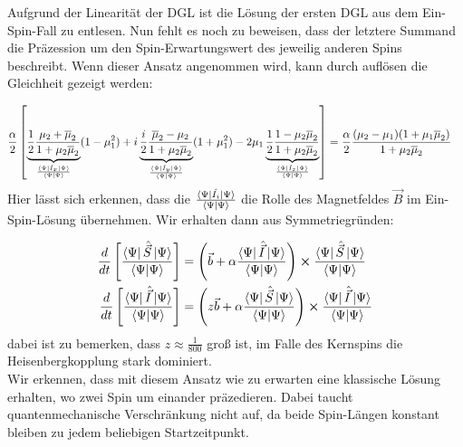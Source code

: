 \noindent Aufgrund der Linearität der DGL ist die Lösung der ersten DGL aus dem Ein-Spin-Fall zu entlesen. Nun fehlt es noch zu beweisen, 
dass der letztere Summand die Präzession um den Spin-Erwartungswert des jeweilig anderen Spins beschreibt. Wenn dieser Ansatz angenommen wird,
kann durch auflösen die Gleichheit gezeigt werden:  

\begin{align}
     \frac{\alpha}{2}\left[\underbrace{\frac{1}{2}\frac{\mu_2 + \overline{\mu}_2}{1+\mu_2\overline{\mu}_2}}_{\frac{\bra{\Psi}\hat{I}_x\ket{\Psi}}{\bra{\Psi}\ket{\Psi}}}(1-\mu_1^2) 
     + i \underbrace{\frac{i}{2}\frac{\overline{\mu}_2 -\mu_2}{1+\mu_2\overline{\mu}_2}}_{\frac{\bra{\Psi}\hat{I}_y\ket{\Psi}}{\bra{\Psi}\ket{\Psi}}}(1+\mu_1^2) 
     - 2\mu_1\underbrace{\frac{1}{2}\frac{1-\mu_2\overline{\mu}_2}{1+\mu_2\overline{\mu}_2}}_{\frac{\bra{\Psi}\hat{I}_z\ket{\Psi}}{\bra{\Psi}\ket{\Psi}}} \right]
     &= \frac{\alpha}{2} \frac{(\mu_2-\mu_1)(1+\mu_1\overline{\mu}_2)}{1+\mu_2\overline{\mu}_2}
\end{align}
Hier lässt sich erkennen, dass die $\frac{\bra{\Psi}\hat{I_i}\ket{\Psi}}{\bra{\Psi}\ket{\Psi}}$ die Rolle des Magnetfeldes $\vec{B}$ im Ein-Spin-Lösung 
übernehmen. Wir erhalten dann aus Symmetriegründen:

\begin{align}
    \frac{d}{dt}\left[\frac{\bra{\Psi}\hat{\vec{S}}\ket{\Psi}}{\bra{\Psi}\ket{\Psi}}\right] &= \left(\vec{b} + \alpha \frac{\bra{\Psi}\hat{\vec{I}}\ket{\Psi}}{\bra{\Psi}\ket{\Psi}}\right)\cross\frac{\bra{\Psi}\hat{\vec{S}}\ket{\Psi}}{\bra{\Psi}\ket{\Psi}}\\
    \frac{d}{dt}\left[\frac{\bra{\Psi}\hat{\vec{I}}\ket{\Psi}}{\bra{\Psi}\ket{\Psi}}\right] &= \left(z\vec{b} + \alpha \frac{\bra{\Psi}\hat{\vec{S}}\ket{\Psi}}{\bra{\Psi}\ket{\Psi}}\right)\cross\frac{\bra{\Psi}\hat{\vec{I}}\ket{\Psi}}{\bra{\Psi}\ket{\Psi}}
\end{align}
\noindent dabei ist zu bemerken, dass $z\approx\frac{1}{800}$ groß ist, im Falle des Kernspins die Heisenbergkopplung stark dominiert.\\
Wir erkennen, dass mit diesem Ansatz wie zu erwarten eine klassische Lösung erhalten, wo zwei Spin um einander präzedieren. Dabei 
taucht quantenmechanische Verschränkung nicht auf, da beide Spin-Längen konstant bleiben zu jedem beliebigen Startzeitpunkt.





















